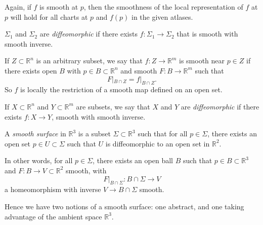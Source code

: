 \documentclass[12pt]{article}
\begin{document}
Again, if $f$ is smooth at $p$, then the smoothness of the local representation of $f$ at $p$ will hold for all charts at $p$ and $f(p)$ in the given atlases.

\begin{definition}
	$\Sigma_1$ and $\Sigma_2$ are \emph{diffeomorphic} if there exists $f : \Sigma_1 \to \Sigma_2$ that is smooth with smooth inverse.
\end{definition}

\begin{definition}
	If $Z \subset \mathbb{R}^{n}$ is an arbitrary subset, we say that $f : Z \to \mathbb{R}^{m}$ is smooth near $p \in Z$ if there exists open $B$ with $p \in B \subset \mathbb{R}^{n}$ and smooth $F : B \to \mathbb{R}^{m}$ such that
	\[
	F|_{B \cap Z} = f|_{B \cap Z}
	.\]
	So $f$ is locally the restriction of a smooth map defined on an open set.
\end{definition}

\begin{definition}
	If $X \subset \mathbb{R}^{n}$ and $Y \subset \mathbb{R}^{m}$ are subsets, we say that $X$ and $Y$ are \emph{diffeomorphic} if there exists $f : X \to Y$, smooth with smooth inverse.
\end{definition}

\begin{definition}
	A \emph{smooth surface} in $\mathbb{R}^3$ is a subset $\Sigma \subset \mathbb{R}^3$ such that for all $p \in \Sigma$, there exists an open set $p \in U \subset \Sigma$ such that $U$ is diffeomorphic to an open set in $\mathbb{R}^2$.

	In other words, for all $p \in \Sigma$, there exists an open ball $B$ such that $p\in B \subset \mathbb{R}^3$ and $F : B \to V \subset \mathbb{R}^2$ smooth, with
	\[
	F|_{B \cap \Sigma} : B \cap \Sigma \to V
	\]
	a homeomorphism with inverse $V \to B \cap \Sigma$ smooth.
\end{definition}

Hence we have two notions of a smooth surface: one abstract, and one taking advantage of the ambient space $\mathbb{R}^3$.
\end{document}
